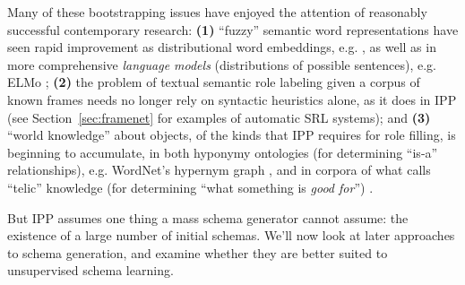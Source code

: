 Many of these bootstrapping issues have enjoyed the attention of reasonably successful contemporary research: \textbf{(1)} ``fuzzy'' semantic word representations have seen rapid improvement as distributional word embeddings, e.g. \citep{mikolov2013}, as well as in more comprehensive \textit{language models} (distributions of possible sentences), e.g. ELMo \citep{elmo}; \textbf{(2)} the problem of textual semantic role labeling given a corpus of known frames needs no longer rely on syntactic heuristics alone, as it does in IPP (see Section~\ref{sec:framenet} for examples of automatic SRL systems); and \textbf{(3)} ``world knowledge'' about objects, of the kinds that IPP requires for role filling, is beginning to accumulate, in both hyponymy ontologies (for determining ``is-a'' relationships), e.g. WordNet's hypernym graph \citep{miller1995wordnet}, and in corpora of what \citet{pustejovsky1991generative} calls ``telic'' knowledge (for determining ``what something is \textit{good for}'') \citep{yamada2004automatic}.

But IPP assumes one thing a mass schema generator cannot assume: the existence of a large number of initial schemas. We'll now look at later approaches to schema generation, and examine whether they are better suited to unsupervised schema learning.